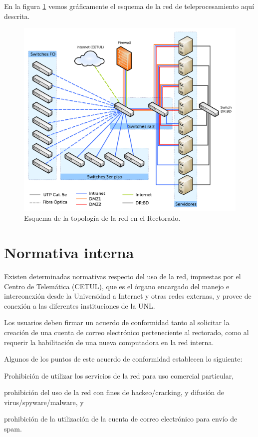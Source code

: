 \documentclass[a4paper,11pt,oneside]{article}
\begin{document}
En la figura \ref{topologia} vemos gráficamente el esquema de la red
de teleprocesamiento aquí descrita.
%
\begin{figure}
  \center\includegraphics[width=\textwidth]{img/red}
  \caption{Esquema de la topología de la red en el Rectorado.}
  \label{topologia}
\end{figure}
%
\section{Normativa interna}
%
Existen determinadas normativas respecto del uso de la red, impuestas
por el Centro de Telemática (CETUL), que es el órgano encargado del
manejo e interconexión desde la Universidad a Internet y otras redes
externas, y provee de conexión a las diferentes instituciones de la
UNL.

Los usuarios deben firmar un acuerdo de conformidad tanto al solicitar
la creación de una cuenta de correo electrónico perteneciente al
rectorado, como al requerir la habilitación de una nueva computadora
en la red interna.

Algunos de los puntos de este acuerdo de conformidad establecen lo
siguiente:
%
\begin{itemize*}
\item Prohibición de utilizar los servicios de la red para uso
  comercial particular,
\item prohibición del uso de la red con fines de hackeo/cracking, y
  difusión de virus/spy\-ware/malware, y
\item prohibición de la utilización de la cuenta de correo electrónico
  para envío de spam.
\end{itemize*}
%
\end{document}
